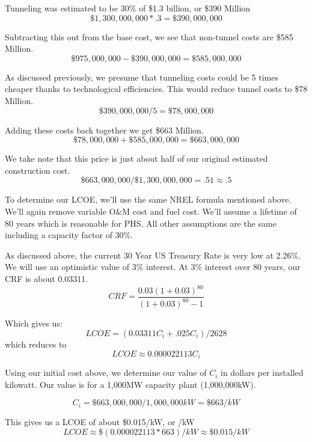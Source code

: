 Tunneling was estimated to be 30\% of \$1.3 billion, or \$390 Million
\[ \$1,300,000,000 * .3 = \$390,000,000\]

Subtracting this out from the base cost, we see that non-tunnel costs are \$585 Million.
\[ \$975,000,000 - \$390,000,000 = \$585,000,000\]

As discussed previously, we presume that tunneling costs could be 5 times cheaper thanks to technological efficiencies. This would reduce tunnel costs to \$78 Million.
\[ \$390,000,000 / 5 = \$78,000,000\]

Adding these costs back together we get \$663 Million.
\[ \$78,000,000 + \$585,000,000 = \$663,000,000 \]

We take note that this price is just about half of our original estimated construction cost.
\[  \$663,000,000  / \$1,300,000,000 = .51 \approx .5 \]

To determine our LCOE, we'll use the same NREL formula mentioned above. We'll again remove variable O\&M cost and fuel cost. We'll assume a lifetime of 80 years which is reasonable for PHS. All other assumptions are the same including a capacity factor of 30\%.

As discussed above, the current 30 Year US Treasury Rate is very low at 2.26\%. We will use an optimistic value of 3\% interest. At 3\% interest over 80 years, our CRF is about 0.03311.
\[ \displaystyle CRF={\frac {0.03(1+0.03)^{80}}{(1+0.03)^{80}-1}} \]

Which gives us:
\[ LCOE = (0.03311C_i + .025C_i) / 2628 \]
which reduces to
\[ LCOE \approx 0.000022113 C_i \]

Using our initial cost above, we determine our value of $C_i$ in dollars per installed kilowatt. Our value is for a 1,000MW capacity plant (1,000,000kW).

\[ C_i = \$663,000,000 / 1,000,000kW = \$663/kW\]

This gives us a LCOE of about \$0.015/kW, or /kW
\[ LCOE \approx \$(0.000022113 * 663)/kW \approx \$0.015/kW \]
